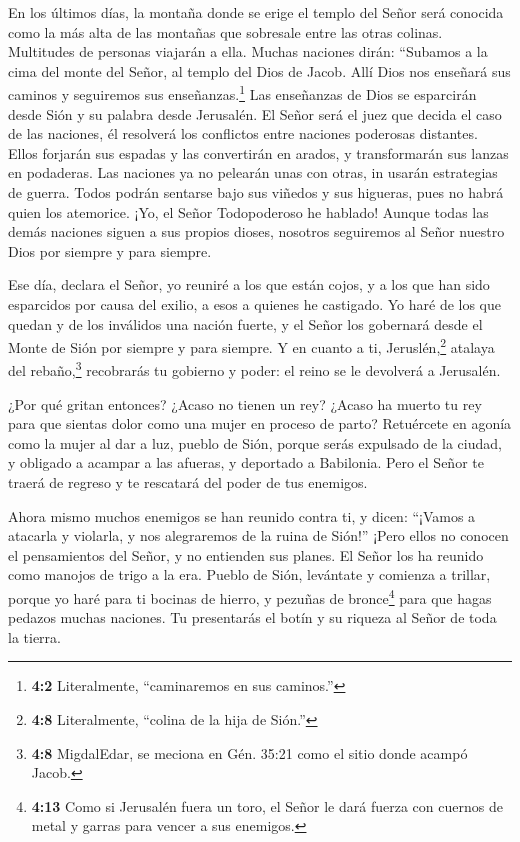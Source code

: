 En los últimos días, la montaña donde se erige el templo
del Señor será conocida como la más alta de las montañas que sobresale
entre las otras colinas. Multitudes de personas viajarán a ella.
 Muchas naciones dirán: ``Subamos a la cima del monte del
Señor, al templo del Dios de Jacob. Allí Dios nos enseñará sus caminos y
seguiremos sus enseñanzas.\footnote{\textbf{4:2} Literalmente,
  ``caminaremos en sus caminos.''} Las enseñanzas de Dios se esparcirán
desde Sión y su palabra desde Jerusalén.  El Señor será el
juez que decida el caso de las naciones, él resolverá los conflictos
entre naciones poderosas distantes. Ellos forjarán sus espadas y las
convertirán en arados, y transformarán sus lanzas en podaderas. Las
naciones ya no pelearán unas con otras, in usarán estrategias de guerra.
 Todos podrán sentarse bajo sus viñedos y sus higueras, pues
no habrá quien los atemorice. ¡Yo, el Señor Todopoderoso he hablado!
 Aunque todas las demás naciones siguen a sus propios
dioses, nosotros seguiremos al Señor nuestro Dios por siempre y para
siempre.

 Ese día, declara el Señor, yo reuniré a los que están
cojos, y a los que han sido esparcidos por causa del exilio, a esos a
quienes he castigado.  Yo haré de los que quedan y de los
inválidos una nación fuerte, y el Señor los gobernará desde el Monte de
Sión por siempre y para siempre.  Y en cuanto a ti,
Jeruslén,\footnote{\textbf{4:8} Literalmente, ``colina de la hija de
  Sión.''} atalaya del rebaño,\footnote{\textbf{4:8} MigdalEdar, se
  meciona en Gén. 35:21 como el sitio donde acampó Jacob.} recobrarás tu
gobierno y poder: el reino se le devolverá a Jerusalén.

 ¿Por qué gritan entonces? ¿Acaso no tienen un rey? ¿Acaso
ha muerto tu rey para que sientas dolor como una mujer en proceso de
parto?  Retuércete en agonía como la mujer al dar a luz,
pueblo de Sión, porque serás expulsado de la ciudad, y obligado a
acampar a las afueras, y deportado a Babilonia. Pero el Señor te traerá
de regreso y te rescatará del poder de tus enemigos.

 Ahora mismo muchos enemigos se han reunido contra ti, y
dicen: ``¡Vamos a atacarla y violarla, y nos alegraremos de la ruina de
Sión!''  ¡Pero ellos no conocen el pensamientos del Señor,
y no entienden sus planes. El Señor los ha reunido como manojos de trigo
a la era.  Pueblo de Sión, levántate y comienza a trillar,
porque yo haré para ti bocinas de hierro, y pezuñas de bronce\footnote{\textbf{4:13}
  Como si Jerusalén fuera un toro, el Señor le dará fuerza con cuernos
  de metal y garras para vencer a sus enemigos.} para que hagas pedazos
muchas naciones. Tu presentarás el botín y su riqueza al Señor de toda
la tierra.

